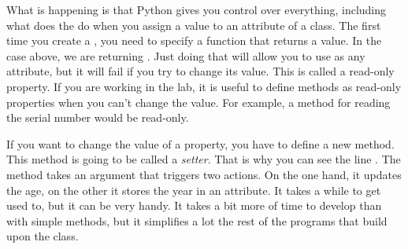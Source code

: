 What is happening is that Python gives you control over everything, including what does the \py{=} do when you assign a value to an attribute of a class. The first time you create a , you need to specify a function that returns a value. In the case above, we are returning . Just doing that will allow you to use  as any attribute, but it will fail if you try to change its value. This is called a read-only property. If you are working in the lab, it is useful to define methods as read-only properties when you can't change the value. For example, a method for reading the serial number would be read-only. 

If you want to change the value of a property, you have to define a new method. This method is going to be called a \textit{setter}. That is why you can see the line . The method takes an argument that triggers two actions. On the one hand, it updates the age, on the other it stores the year in an attribute. It takes a while to get used to, but it can be very handy. It takes a bit more of time to develop than with simple methods, but it simplifies a lot the rest of the programs that build upon the class. 
